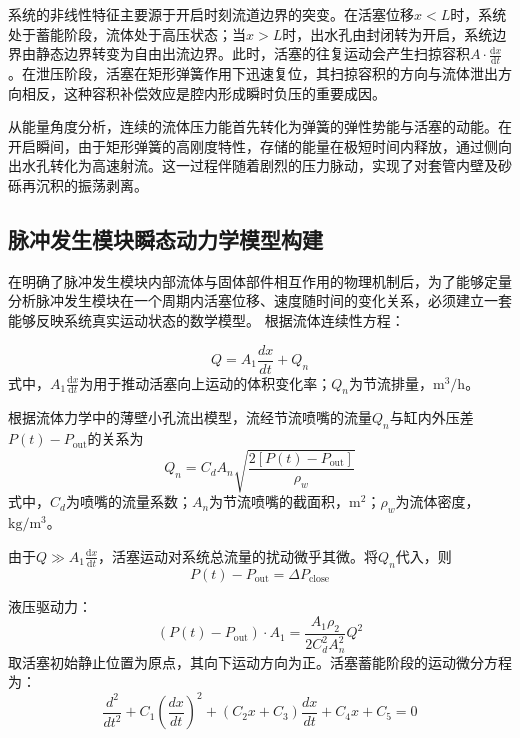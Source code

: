 系统的非线性特征主要源于开启时刻流道边界的突变。在活塞位移$x<L$时，系统处于蓄能阶段，流体处于高压状态；当$x>L$时，出水孔由封闭转为开启，系统边界由静态边界转变为自由出流边界。此时，活塞的往复运动会产生扫掠容积$A\cdot\frac{\mathrm{d}x}{\mathrm{d}t}$。在泄压阶段，活塞在矩形弹簧作用下迅速复位，其扫掠容积的方向与流体泄出方向相反，这种容积补偿效应是腔内形成瞬时负压的重要成因。

从能量角度分析，连续的流体压力能首先转化为弹簧的弹性势能与活塞的动能。在开启瞬间，由于矩形弹簧的高刚度特性，存储的能量在极短时间内释放，通过侧向出水孔转化为高速射流。这一过程伴随着剧烈的压力脉动，实现了对套管内壁及砂砾再沉积的振荡剥离。


\subsection{脉冲发生模块瞬态动力学模型构建}
在明确了脉冲发生模块内部流体与固体部件相互作用的物理机制后，为了能够定量分析脉冲发生模块在一个周期内活塞位移、速度随时间的变化关系，必须建立一套能够反映系统真实运动状态的数学模型。
根据流体连续性方程：

\begin{equation}
	Q = A_1\frac{dx}{dt}+Q_n
\end{equation}
式中，$A_1\frac{\mathrm{d}x}{\mathrm{d}t}$为用于推动活塞向上运动的体积变化率；$Q_n$为节流排量，$\mathrm{m^3/h}$。

根据流体力学中的薄壁小孔流出模型，流经节流喷嘴的流量$Q_n$与缸内外压差$P(t)-P_{\mathrm{out}}$的关系为
\begin{equation}
	Q_n=C_dA_n\sqrt{\frac{2\left[P(t)-P_{\mathrm{out}}\right]}{\rho_w}}
\end{equation}
式中，$C_d$为喷嘴的流量系数；$A_n$为节流喷嘴的截面积，$\mathrm{m^2}$；$\rho_w$为流体密度，$\mathrm{kg/m^3}$。

由于$Q \gg A_1\frac{\mathrm{d}x}{\mathrm{d}t}$，活塞运动对系统总流量的扰动微乎其微。将$Q_n$代入，则
\begin{equation}
	P(t)-P_{\mathrm{out}}=\Delta P_{\mathrm{close}}
\end{equation}


液压驱动力：
\begin{equation}
	\left(P(t)-P_{\mathrm{out}}\right)\cdot A_1=\frac{A_1\rho_2}{2C_d^2A_n^2}Q^2
\end{equation}
取活塞初始静止位置为原点，其向下运动方向为正。活塞蓄能阶段的运动微分方程为：
\begin{equation}
	\frac{d^2}{dt^2}+C_1\left(\frac{dx}{dt}\right)^2+\left(C_2 x+C_3\right)\frac{dx}{dt}+C_4 x+ C_5 =0
\end{equation}

